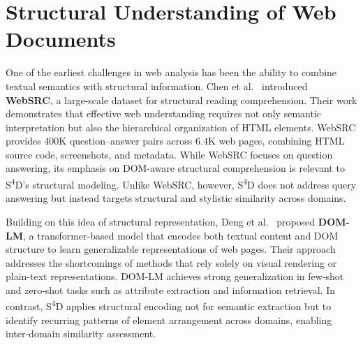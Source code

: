 
\section{Structural Understanding of Web Documents}
\label{sec:structural-understanding}

One of the earliest challenges in web analysis has been the ability to combine textual semantics with structural information. Chen et al.~\cite{chen2021websrc} introduced \textbf{WebSRC}, a large-scale dataset for structural reading comprehension. Their work demonstrates that effective web understanding requires not only semantic interpretation but also the hierarchical organization of HTML elements. WebSRC provides 400K question--answer pairs across 6.4K web pages, combining HTML source code, screenshots, and metadata. While WebSRC focuses on question answering, its emphasis on DOM-aware structural comprehension is relevant to S\textsuperscript{4}D’s structural modeling. Unlike WebSRC, however, S\textsuperscript{4}D does not address query answering but instead targets structural and stylistic similarity across domains.

Building on this idea of structural representation, Deng et al.~\cite{deng2022domlm} proposed \textbf{DOM-LM}, a transformer-based model that encodes both textual content and DOM structure to learn generalizable representations of web pages. Their approach addresses the shortcomings of methods that rely solely on visual rendering or plain-text representations. DOM-LM achieves strong generalization in few-shot and zero-shot tasks such as attribute extraction and information retrieval. In contrast, S\textsuperscript{4}D applies structural encoding not for semantic extraction but to identify recurring patterns of element arrangement across domains, enabling inter-domain similarity assessment.


